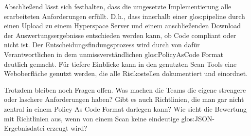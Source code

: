 \documentclass[../main.tex]{subfiles}
\begin{document}
Abschließend lässt sich festhalten, dass die umgesetzte Implementierung alle erarbeiteten Anforderungen erfüllt.
D.h., dass innerhalb einer \gls{glos:pipeline} durch einen Upload zu einem Hyperspace Server und einem anschließenden Download der Auswertungsergebnisse entschieden werden kann, ob Code compliant oder nicht ist.
Der Entscheidungsfindungsprozess wird durch von dafür Verantwortlichen in dem unmissverständlichen \gls{glos:PolicyAsCode} Format deutlich gemacht.
Für tiefere Einblicke kann in den genutzten Scan Tools eine Weboberfläche genutzt werden, die alle Risikostellen dokumentiert und einordnet.

Trotzdem bleiben noch Fragen offen.
Was machen die Teams die eigene strengere oder laschere Anforderungen haben?
Gibt es auch Richtlinien, die man gar nicht zentral in einem Policy As Code Format darlegen kann?
Wie sieht die Bewertung mit Richtlinien aus, wenn von einem Scan keine eindeutige \gls{glos:JSON}-Ergebnisdatei erzeugt wird?
\end{document}
